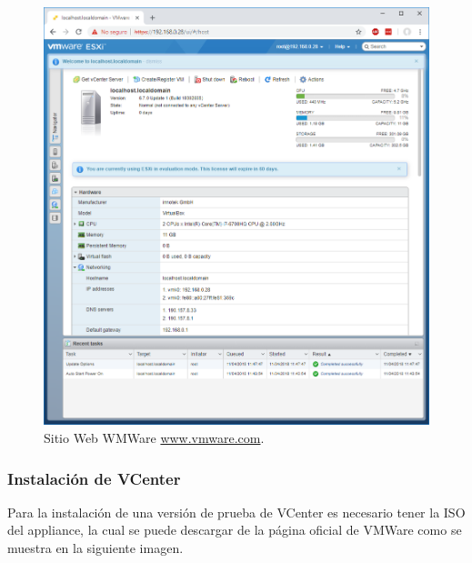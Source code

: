 \begin{figure}[!hbtp]
	\centering
	\includegraphics[width=\linewidth]{RE01_VMwareESXi/RE_VMwareInstalacion16.png}
	\vspace{-0.2cm}
	\caption{Sitio Web WMWare \url{www.vmware.com}.\footnotemark[2]{} }
	\label{fig:VMwareInstalacion16}
\end{figure}

\subsubsection{Instalación de VCenter}

Para la instalación de una versión de prueba de VCenter es necesario tener la ISO del appliance, la cual se puede descargar de la página oficial de VMWare como se muestra en la siguiente imagen.



